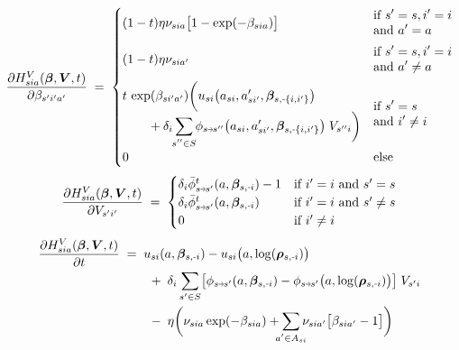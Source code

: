 \documentclass[11pt,fleqn]{article}
\newcommand{\bbeta}{\bm{\beta}}
\newcommand{\brho}{\bm{\rho}}
\newcommand{\bV}{\bm{V}}
\newcommand{\shortminus}{{\text{\scalebox{0.4}[1.0]{\(-\)}}}}
\newcommand{\minusi}{\shortminus i}
\newcommand{\shortrightarrow}{\parbox{4pt}{\tikz{\draw[->](0,0)--(4pt,0);}}}
\newcommand{\phiss}{\phi_{s\shortrightarrow s'}}
\newcommand{\barphiss}{\bar{\phi}_{s\shortrightarrow s'}}
\begin{document}
\begin{align*}
	\frac{ \partial H^V_{sia}(\bbeta,\bV,t) }{ \partial \beta_{s'i'a'} } \;=\; 
		\begin{cases}
			\begin{aligned}
				& (1-t)\eta \nu_{sia} \bigl[1-\exp(-\beta_{sia})\bigr]
			\end{aligned} & 
			\begin{aligned}
				& \text{if } s'=s, i'=i \\ &\text{and } a'=a
			\end{aligned} \\[1em]
			\begin{aligned}
				& (1-t)\eta \nu_{sia'}
			\end{aligned} & 
			\begin{aligned}
				& \text{if } s'=s, i'=i \\ &\text{and } a'\neq a
			\end{aligned} \\[1em]
			\begin{aligned} 
				& t \, \exp(\beta_{si'a'}) \biggl( u_{si}\bigl(a_{si},a_{si'}',\bbeta_{s,\shortminus\{i,i'\}}\bigr) \\
				& \qquad + \delta_i \sum\limits_{\mathclap{s''\in S}} \phi_{s\shortrightarrow s''}\bigl(a_{si},a_{si'}',\bbeta_{s,\shortminus\{i,i'\}}\bigr) \; V_{s''i} \biggr)
			\end{aligned} & 
			\begin{aligned}
				& \text{if } s'=s \\ &\text{and } i'\neq i  
			\end{aligned} \\[1em]
			0 & \text{else}
		\end{cases}
\end{align*}
\begin{align*}
	\frac{ \partial H^V_{sia}(\bbeta,\bV,t) }{ \partial V_{s'i'} } \;=\;
		\begin{cases}
			\delta_i \barphiss^t(a,\bbeta_{s,\minusi}) - 1 &\text{if } i'=i \text{ and } s'=s \\
			\delta_i \barphiss^t(a,\bbeta_{s,\minusi}) &\text{if } i'=i \text{ and } s'\neq s \\
			0 &\text{if } i'\neq i
		\end{cases}
\end{align*}
\begin{align*}
	\frac{\partial H^V_{sia}(\bbeta,\bV,t) }{ \partial t } & \;=\; 
		u_{si}(a,\bbeta_{s,\minusi}) - u_{si}\bigl(a,\log(\brho_{s,\minusi})\bigr) \\
		& \qquad \;+\; \delta_i \sum\limits_{s'\in S} \bigl[ \phiss(a,\bbeta_{s,\minusi}) - \phiss\bigl(a,\log(\brho_{s,\minusi})\bigr) \bigr] \; V_{s'i} \\
		& \qquad \;-\; \eta \biggl( \nu_{sia}\exp(-\beta_{sia}) + \sum\limits_{\mathclap{a'\in A_{si}}} \nu_{sia'} \bigl[ \beta_{sia'} - 1 \bigr] \biggr)
\end{align*}
\end{document}
